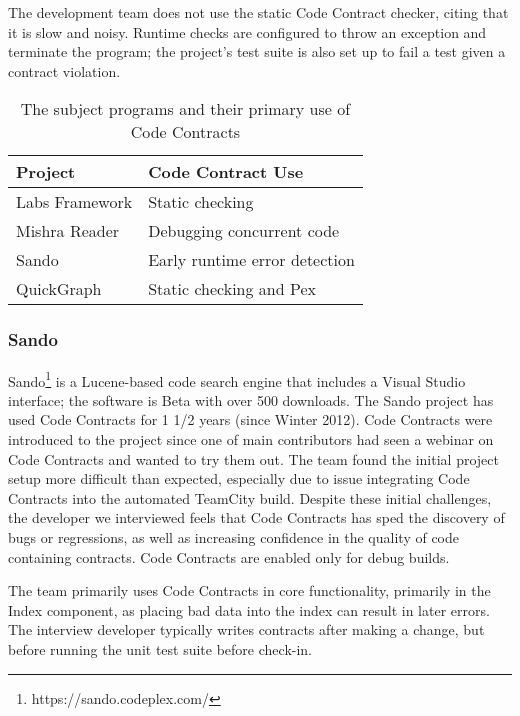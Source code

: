 The development team does not use the static Code Contract checker,
citing that it is slow and noisy. Runtime checks are configured to
throw an exception and terminate the program; the project's test suite
is also set up to fail a test given a contract violation.

\begin{table}[t]
\begin{center}{
\begin{tabular}{ ll }
  Project & Code Contract Use \\ \hline
  Labs Framework & Static checking \\
  Mishra Reader & Debugging concurrent code \\
  Sando & Early runtime error detection \\
  QuickGraph & Static checking and Pex
\end{tabular} }
\end{center}
\caption{The subject programs and their primary use of Code Contracts}
\end{table}

\subsubsection{Sando}

Sando\footnote{https://sando.codeplex.com/} is a Lucene-based code
search engine that includes a Visual Studio interface; the software is
Beta with over 500 downloads.
%
The Sando project has used Code Contracts for 1 1/2 years (since
Winter 2012). Code Contracts were introduced to the project since one
of main contributors had seen a webinar on Code Contracts and wanted
to try them out. The team found the initial project setup more
difficult than expected, especially due to issue integrating Code
Contracts into the automated TeamCity build. Despite these initial
challenges, the developer we interviewed feels that Code Contracts has
sped the discovery of bugs or regressions, as well as increasing
confidence in the quality of code containing contracts. Code Contracts
are enabled only for debug builds.

The team primarily uses Code Contracts in core functionality,
primarily in the Index component, as placing bad data into the index
can result in later errors. The interview developer typically writes
contracts after making a change, but before running the unit test
suite before check-in.

